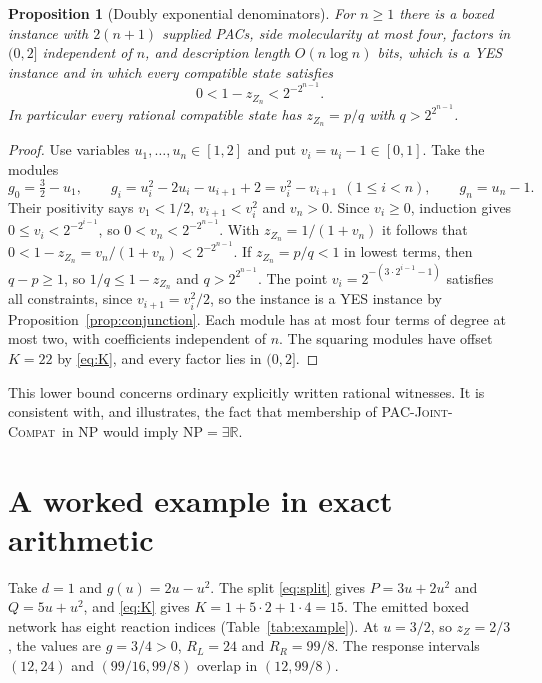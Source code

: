 \documentclass[11pt,a4paper]{article}
\theoremstyle{plain}
\newtheorem{proposition}[theorem]{Proposition}
\theoremstyle{definition}
\theoremstyle{remark}
\newcommand{\ER}{\exists\mathbb{R}}
\newcommand{\PJC}{\textup{\textsc{PAC-Joint-Compat}}}
\begin{document}
\begin{proposition}[Doubly exponential denominators]\label{prop:precision}
For $n\ge1$ there is a boxed instance with $2(n+1)$ supplied PACs, side molecularity at most four, factors in $(0,2]$ independent of $n$, and description length $O(n\log n)$ bits, which is a YES instance and in which every compatible state satisfies
\[
 0<1-z_{Z_n}<2^{-2^{n-1}}.
\]
In particular every rational compatible state has $z_{Z_n}=p/q$ with $q>2^{2^{n-1}}$.
\end{proposition}

\begin{proof}
Use variables $u_1,\ldots,u_n\in[1,2]$ and put $v_i=u_i-1\in[0,1]$. Take the modules
\[
 g_0=\tfrac32-u_1,\qquad g_i=u_i^2-2u_i-u_{i+1}+2=v_i^2-v_{i+1}\ \ (1\le i<n),\qquad g_n=u_n-1 .
\]
Their positivity says $v_1<1/2$, $v_{i+1}<v_i^2$ and $v_n>0$. Since $v_i\ge0$, induction gives $0\le v_i<2^{-2^{i-1}}$, so $0<v_n<2^{-2^{n-1}}$. With $z_{Z_n}=1/(1+v_n)$ it follows that $0<1-z_{Z_n}=v_n/(1+v_n)<2^{-2^{n-1}}$. If $z_{Z_n}=p/q<1$ in lowest terms, then $q-p\ge1$, so $1/q\le1-z_{Z_n}$ and $q>2^{2^{n-1}}$. The point $v_i=2^{-(3\cdot2^{i-1}-1)}$ satisfies all constraints, since $v_{i+1}=v_i^2/2$, so the instance is a YES instance by Proposition~\ref{prop:conjunction}. Each module has at most four terms of degree at most two, with coefficients independent of $n$. The squaring modules have offset $K=22$ by \eqref{eq:K}, and every factor lies in $(0,2]$.
\end{proof}

This lower bound concerns ordinary explicitly written rational witnesses. It is consistent with, and illustrates, the fact that membership of \PJC\ in NP would imply $\mathrm{NP}=\ER$.

\section{A worked example in exact arithmetic}\label{sec:example}

Take $d=1$ and $g(u)=2u-u^2$. The split \eqref{eq:split} gives $P=3u+2u^2$ and $Q=5u+u^2$, and \eqref{eq:K} gives $K=1+5\cdot2+1\cdot4=15$. The emitted boxed network has eight reaction indices (Table~\ref{tab:example}). At $u=3/2$, so $z_Z=2/3$, the values are $g=3/4>0$, $R_L=24$ and $R_R=99/8$. The response intervals $(12,24)$ and $(99/16,99/8)$ overlap in $(12,99/8)$.
\end{document}

